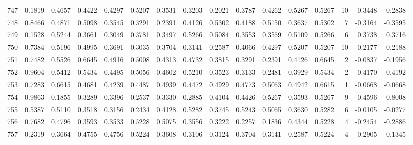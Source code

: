 \begin{tabular}{lrrrrrrrrrrrrrrr}
747 &      0.1819 &  0.4657 &  0.4422 &  0.4297 &  0.5207 &  0.3531 &  0.3203 &  0.2021 &  0.3787 &  0.4262 &   0.5267 &     0.5267 &     10 &                    0.3448 &                     0.2838 \\
748 &      0.8466 &  0.4871 &  0.5098 &  0.3545 &  0.3291 &  0.2391 &  0.4126 &  0.5302 &  0.4188 &  0.5150 &   0.3637 &     0.5302 &      7 &                   -0.3164 &                    -0.3595 \\
749 &      0.1528 &  0.5244 &  0.3661 &  0.3049 &  0.3781 &  0.3497 &  0.5266 &  0.5084 &  0.3553 &  0.3569 &   0.5109 &     0.5266 &      6 &                    0.3738 &                     0.3716 \\
750 &      0.7384 &  0.5196 &  0.4995 &  0.3691 &  0.3035 &  0.3704 &  0.3141 &  0.2587 &  0.4066 &  0.4297 &   0.5207 &     0.5207 &     10 &                   -0.2177 &                    -0.2188 \\
751 &      0.7482 &  0.5526 &  0.6645 &  0.4916 &  0.5008 &  0.4313 &  0.4732 &  0.3815 &  0.3291 &  0.2391 &   0.4126 &     0.6645 &      2 &                   -0.0837 &                    -0.1956 \\
752 &      0.9604 &  0.5412 &  0.5434 &  0.4495 &  0.5056 &  0.4602 &  0.5210 &  0.3523 &  0.3133 &  0.2481 &   0.3929 &     0.5434 &      2 &                   -0.4170 &                    -0.4192 \\
753 &      0.7283 &  0.6615 &  0.4681 &  0.4239 &  0.4487 &  0.4939 &  0.4472 &  0.4929 &  0.4773 &  0.5063 &   0.4942 &     0.6615 &      1 &                   -0.0668 &                    -0.0668 \\
754 &      0.9863 &  0.1855 &  0.3289 &  0.3396 &  0.2537 &  0.3330 &  0.2885 &  0.4104 &  0.4426 &  0.5267 &   0.3593 &     0.5267 &      9 &                   -0.4596 &                    -0.8008 \\
755 &      0.5387 &  0.5110 &  0.3518 &  0.3156 &  0.2434 &  0.4128 &  0.5282 &  0.3745 &  0.5243 &  0.5065 &   0.3630 &     0.5282 &      6 &                   -0.0105 &                    -0.0277 \\
756 &      0.7682 &  0.4796 &  0.3593 &  0.3533 &  0.5228 &  0.5075 &  0.3556 &  0.3222 &  0.2257 &  0.1836 &   0.4344 &     0.5228 &      4 &                   -0.2454 &                    -0.2886 \\
757 &      0.2319 &  0.3664 &  0.4755 &  0.4756 &  0.5224 &  0.3608 &  0.3106 &  0.3124 &  0.3704 &  0.3141 &   0.2587 &     0.5224 &      4 &                    0.2905 &                     0.1345 \\

\end{tabular}
